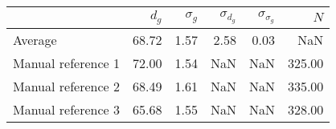 \begin{tabular}{lrrrrr}
\toprule
{} &  $d_g$ &  $\sigma_g$ &  $\sigma_{d_g}$ &  $\sigma_{\sigma_g}$ &    $N$ \\
\midrule
Average            &  68.72 &        1.57 &            2.58 &                 0.03 &    NaN \\
Manual reference 1 &  72.00 &        1.54 &             NaN &                  NaN & 325.00 \\
Manual reference 2 &  68.49 &        1.61 &             NaN &                  NaN & 335.00 \\
Manual reference 3 &  65.68 &        1.55 &             NaN &                  NaN & 328.00 \\
\bottomrule
\end{tabular}
